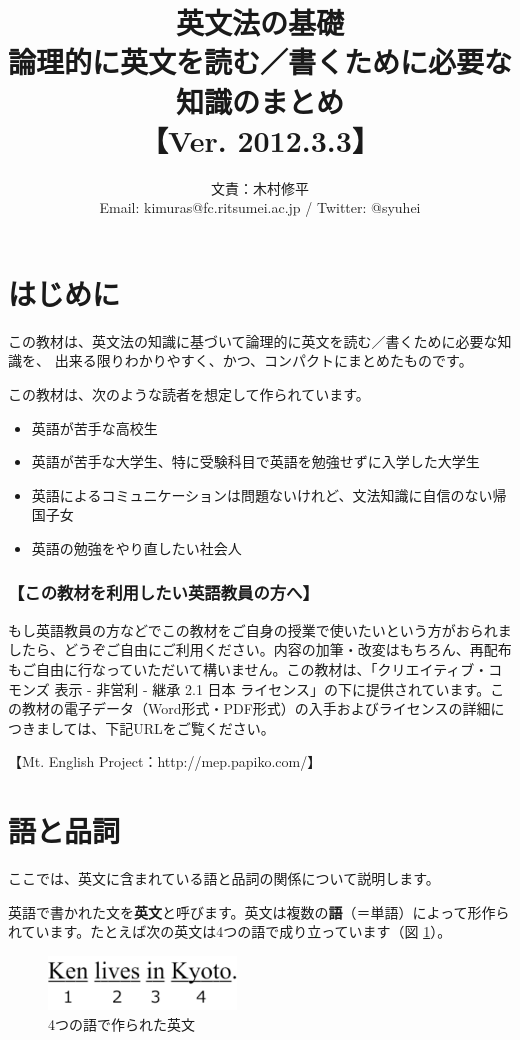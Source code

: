 \documentclass[titlepage]{jsarticle}
\title{英文法の基礎\\ 論理的に英文を読む／書くために必要な知識のまとめ\\【Ver. 2012.3.3】
}  %
\author{文責：木村修平\\Email: kimuras@fc.ritsumei.ac.jp / Twitter: @syuhei}     %
\begin{document}
\maketitle
\tableofcontents

\newpage


\setcounter{section}{-1}
\section{はじめに}
この教材は、英文法の知識に基づいて論理的に英文を読む／書くために必要な知識を、
出来る限りわかりやすく、かつ、コンパクトにまとめたものです。

この教材は、次のような読者を想定して作られています。
\begin{itemize}
\item 英語が苦手な高校生
\item 英語が苦手な大学生、特に受験科目で英語を勉強せずに入学した大学生
\item 英語によるコミュニケーションは問題ないけれど、文法知識に自信のない帰国子女
\item 英語の勉強をやり直したい社会人
\end{itemize}


\subsubsection*{【この教材を利用したい英語教員の方へ】}
もし英語教員の方などでこの教材をご自身の授業で使いたいという方がおられましたら、どうぞご自由にご利用ください。内容の加筆・改変はもちろん、再配布もご自由に行なっていただいて構いません。この教材は、「クリエイティブ・コモンズ 表示 - 非営利 - 継承 2.1 日本 ライセンス」の下に提供されています。この教材の電子データ（Word形式・PDF形式）の入手およびライセンスの詳細につきましては、下記URLをご覧ください。

【Mt. English Project：http://mep.papiko.com/】


\section{語と品詞}
ここでは、英文に含まれている語と品詞の関係について説明します。

英語で書かれた文を{\bf 英文}と呼びます。英文は複数の{\bf 語}（＝単語）によって形作られています。たとえば次の英文は4つの語で成り立っています（図 \ref{fig1}）。
 
 \begin{figure}[htbp]
  \begin{center}
   \includegraphics[width=5cm]{./figure/fig1.pdf}
   \caption{4つの語で作られた英文}
   \label{fig1}
  \end{center}
 \end{figure}
 
\end{document}
